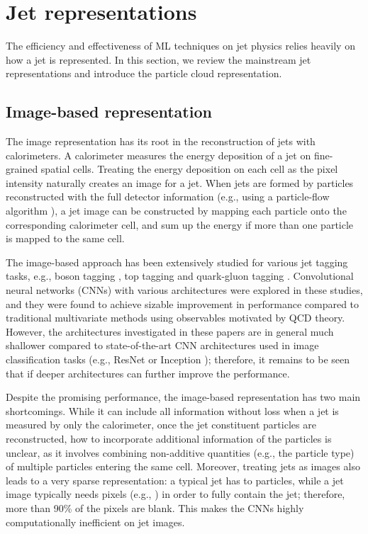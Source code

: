 \documentclass[aps,prd,longbibliography,reprint,amsmath,amssymb,amsfonts]{revtex4-1}
\begin{document}
\section{Jet representations}
\label{sec:representations}

The efficiency and effectiveness of ML techniques on jet physics relies heavily on how a jet is represented. In this section, we review the mainstream jet representations and introduce the particle cloud representation.


\subsection{Image-based representation}

The image representation has its root in the reconstruction of jets with calorimeters. A calorimeter measures the energy deposition of a jet on fine-grained spatial cells. Treating the energy deposition on each cell as the pixel intensity naturally creates an image for a jet. When jets are formed by particles reconstructed with the full detector information (e.g., using a particle-flow algorithm \cite{Sirunyan:2017ulk,Aaboud:2017aca}), a jet image can be constructed by mapping each particle onto the corresponding calorimeter cell, and sum up the energy if more than one particle is mapped to the same cell. 

The image-based approach has been extensively studied for various jet tagging tasks, e.g.,  boson tagging \cite{Cogan:2014oua,Almeida:2015jua,deOliveira:2015xxd,Baldi:2016fql,Barnard:2016qma,Dreyer:2018nbf}, top tagging \cite{Kasieczka:2017nvn,Macaluso:2018tck,Choi:2018dag} and quark-gluon tagging \cite{Komiske:2016rsd,ATL-PHYS-PUB-2017-017}. Convolutional neural networks (CNNs) with various architectures were explored in these studies, and they were found to achieve sizable improvement in performance compared to traditional multivariate methods using observables motivated by QCD theory. However, the architectures investigated in these papers are in general much shallower compared to state-of-the-art CNN architectures used in image classification tasks (e.g., ResNet \cite{he2016deep} or Inception \cite{szegedy2016rethinking}); therefore, it remains to be seen that if deeper architectures can further improve the performance. 

Despite the promising performance, the image-based representation has two main shortcomings. While it can include all information without loss when a jet is measured by only the calorimeter, once the jet constituent particles are reconstructed, how to incorporate additional information of the particles is unclear, as it involves combining non-additive quantities (e.g., the particle type) of multiple particles entering the same cell. Moreover, treating jets as images also leads to a very sparse representation: a typical jet has  to  particles, while a jet image typically needs  pixels (e.g., ) in order to fully contain the jet; therefore, more than 90\% of the pixels are blank. This makes the CNNs highly computationally inefficient on jet images. 
\end{document}
